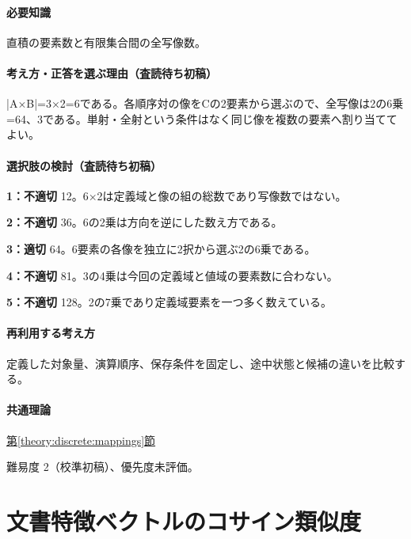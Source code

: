 \paragraph{必要知識} 直積の要素数と有限集合間の全写像数。

\paragraph{考え方・正答を選ぶ理由（査読待ち初稿）} |A×B|=3×2=\allowbreak{}6である。各順序対の像をCの2要素から選ぶので、全写像は2の6乗=64、3である。単射・全射という条件はなく同じ像を複数の要素へ割り当ててよい。

\paragraph{選択肢の検討（査読待ち初稿）}\mbox{}\par

\noindent\textbf{1：不適切} 12。6×2は定義域と像の組の総数であり写像数ではない。\par

\noindent\textbf{2：不適切} 36。6の2乗は方向を逆にした数え方である。\par

\noindent\textbf{3：適切} 64。6要素の各像を独立に2択から選ぶ2の6乗である。\par

\noindent\textbf{4：不適切} 81。3の4乗は今回の定義域と値域の要素数に合わない。\par

\noindent\textbf{5：不適切} 128。2の7乗であり定義域要素を一つ多く数えている。\par

\paragraph{再利用する考え方} 定義した対象量、演算順序、保存条件を固定し、途中状態と候補の違いを比較する。

\paragraph{共通理論} \hyperref[theory:discrete:mappings]{第\ref*{theory:discrete:mappings}節}

\par 難易度 2（校準初稿）、優先度未評価。

\section{文書特徴ベクトルのコサイン類似度}

